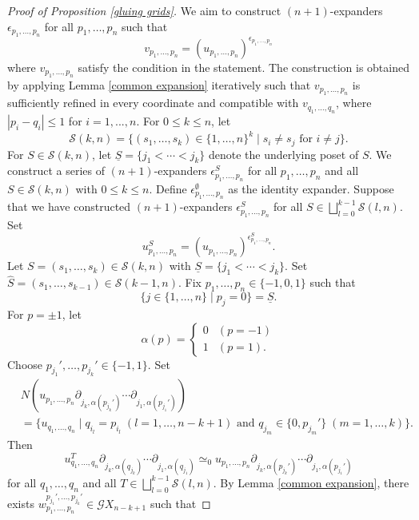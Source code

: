 \documentclass[10pt,a4paper]{amsart}
\begin{document}
	\begin{proof}
		[Proof of Proposition \ref{gluing grids}]
		We aim to construct $(n+1)$-expanders $\epsilon_{p_1,\ldots,p_n}$ for all $p_1,\ldots,p_n$ such that
		\[
		v_{p_1,\ldots,p_n}=(u_{p_1,\ldots,p_n})^{\epsilon_{p_1,\ldots,p_n}}
		\]
		where $v_{p_1,\ldots,p_n}$ satisfy the condition in the statement. The construction is obtained by applying Lemma \ref{common expansion} iteratively such that $v_{p_1,\ldots,p_n}$ is sufficiently refined in every coordinate and compatible with $v_{q_1,\ldots,q_n}$, where $|p_i-q_i|\le1$ for $i=1,...,n$. For $0\le k\le n$, let
		\[
		\mathcal{S}(k,n)=\{(s_1,\ldots,s_k)\in\{1,\ldots,n\}^k\mid s_i\ne s_j\text{ for }i\ne j\}.
		\]
		For $S\in\mathcal{S}(k,n)$, let $\underline{S}=\{j_1<\cdots<j_k\}$ denote the underlying poset of $S$. We construct a series of $(n+1)$-expanders $\epsilon_{p_1,\ldots,p_n}^S$ for all $p_1,\ldots,p_n$ and all $S\in\mathcal{S}(k,n)$ with $0\le k\le n$. Define $\epsilon_{p_1,\ldots,p_n}^\emptyset$ as the identity expander. Suppose that we have constructed $(n+1)$-expanders $\epsilon_{p_1,\ldots,p_n}^S$ for all $S\in\bigsqcup_{l=0}^{k-1}\mathcal{S}(l,n)$. Set
		\[
		u_{p_1,\ldots,p_n}^S=(u_{p_1,\ldots,p_n})^{\epsilon_{p_1,\ldots,p_n}^S}.
		\]
		Let $S=(s_1,\ldots,s_k)\in\mathcal{S}(k,n)$ with $\underline{S}=\{j_1<\cdots<j_k\}$. Set $\widehat{S}=(s_1,\ldots,s_{k-1})\in\mathcal{S}(k-1,n)$. Fix $p_1,\ldots,p_n\in\{-1,0,1\}$ such that
		\[
		\{j\in\{1,\ldots,n\}\mid p_j=0\}=\underline{S}.
		\]
		For $p=\pm 1$, let
		\[
		\alpha(p)=
		\begin{cases}
			0&(p=-1)\\
			1&(p=1).
		\end{cases}
		\]
		Choose $p_{j_1}',\ldots,p_{j_k}'\in\{-1,1\}$. Set
		\begin{align*}
			&N(u_{p_1,\ldots,p_n}\partial_{j_k,\alpha(p_{j_k}')}\cdots\partial_{j_1,\alpha(p_{j_1}')})\\
			&=\{u_{q_1,\ldots,q_n}\mid q_{i_l}=p_{i_l}\;(l=1,\ldots,n-k+1)\text{ and }q_{j_m}\in\{0,p_{j_m}'\}\;(m=1,\ldots,k)\}.
		\end{align*}
		Then
		\[
		u_{q_1,\ldots,q_n}^T\partial_{j_k,\alpha(q_{j_k})}\cdots\partial_{j_1,\alpha(q_{j_1})}\simeq_0u_{p_1,\ldots,p_n}\partial_{j_k,\alpha(p_{j_k}')}\cdots\partial_{j_1,\alpha(p_{j_1}')}
		\]
		for all $q_1,\ldots,q_n$ and all $T\in\bigsqcup_{l=0}^{k-1}\mathcal{S}(l,n)$. By Lemma \ref{common expansion}, there exists $w_{p_1,\ldots,p_n}^{p_{j_1}',\ldots,p_{j_k}'}\in\mathcal{G}X_{n-k+1}$ such that

\end{proof}
\end{document}
